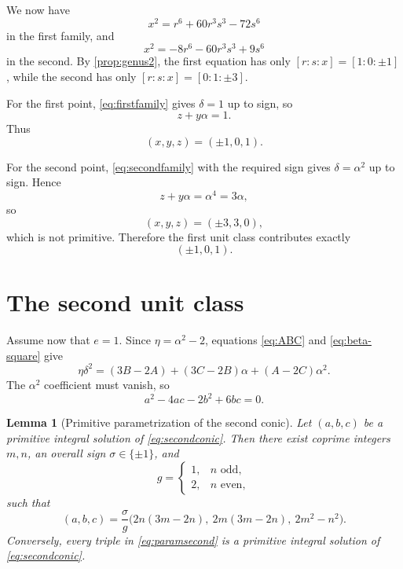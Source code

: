 \documentclass[11pt,a4paper]{article}
\newtheorem{lemma}[lemma]{Lemma}
\newcommand{\etaunit}{\eta}
\begin{document}
We now have
\[
x^2=r^6+60r^3s^3-72s^6
\]
in the first family, and
\[
x^2=-8r^6-60r^3s^3+9s^6
\]
in the second.  By \cref{prop:genus2}, the first equation has only
$[r:s:x]=[1:0:\pm1]$, while the second has only
$[r:s:x]=[0:1:\pm3]$.

For the first point, \eqref{eq:firstfamily} gives $\delta=1$ up to sign,
so
\[
z+y\alpha=1.
\]
Thus
\[
(x,y,z)=(\pm1,0,1).
\]

For the second point, \eqref{eq:secondfamily} with the required sign gives
$\delta=\alpha^2$ up to sign.  Hence
\[
z+y\alpha=\alpha^4=3\alpha,
\]
so
\[
(x,y,z)=(\pm3,3,0),
\]
which is not primitive.  Therefore the first unit class contributes
exactly
\[
(\pm1,0,1).
\]

\section{The second unit class}

Assume now that $e=1$.  Since $\etaunit=\alpha^2-2$, equations
\eqref{eq:ABC} and \eqref{eq:beta-square} give
\[
\etaunit\delta^2
 =(3B-2A)+(3C-2B)\alpha+(A-2C)\alpha^2.
\]
The $\alpha^2$ coefficient must vanish, so
\begin{equation}\label{eq:secondconic}
a^2-4ac-2b^2+6bc=0.
\end{equation}

\begin{lemma}[Primitive parametrization of the second conic]\label{lem:secondparam}
Let $(a,b,c)$ be a primitive integral solution of
\eqref{eq:secondconic}.  Then there exist coprime integers $m,n$, an
overall sign $\sigma\in\{\pm1\}$, and
\[
g=
\begin{cases}
1,&n\text{ odd},\\
2,&n\text{ even},
\end{cases}
\]
such that
\begin{equation}\label{eq:paramsecond}
(a,b,c)=\frac{\sigma}{g}
\bigl(2n(3m-2n),\ 2m(3m-2n),\ 2m^2-n^2\bigr).
\end{equation}
Conversely, every triple in \eqref{eq:paramsecond} is a primitive integral
solution of \eqref{eq:secondconic}.
\end{lemma}
\end{document}

